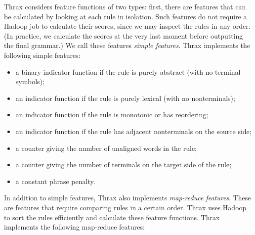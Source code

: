 \documentclass[11pt]{article}
\begin{document}
Thrax considers feature functions of two types: first, there are features that can be calculated by looking at each rule in isolation. Such features do not require a Hadoop job to calculate their scores, since we may inspect the rules in any order. (In practice, we calculate the scores at the very last moment before outputting the final grammar.) We call these features {\em simple features}. Thrax implements the following simple features:
\begin{itemize}
\item a binary indicator function if the rule is purely abstract (with no terminal symbols);
\item an indicator function if the rule is purely lexical (with no nonterminals);
\item an indicator function if the rule is monotonic or has reordering;
\item an indicator function if the rule has adjacent nonterminals on the source side;
\item a counter giving the number of unaligned words in the rule;
\item a counter giving the number of terminals on the target side of the rule;
\item a constant phrase penalty.
\end{itemize}
In addition to simple features, Thrax also implements {\em map-reduce features}. These are features that require comparing rules in a certain order. Thrax uses Hadoop to sort the rules efficiently and calculate these feature functions. Thrax implements the following map-reduce features:
\end{document}
